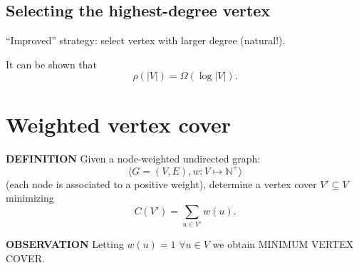 \subsection{Selecting the highest-degree vertex}
``Improved'' strategy: select vertex with larger degree (natural!).

It can be shown that
\[\rho(|V|)=\Omega(\log|V|).\]
\section{Weighted vertex cover}
\begin{notesdefinition}
\textbf{DEFINITION} Given a node-weighted undirected graph:
\[\langle G=(V,E),w:V\mapsto\mathbb N^+\rangle\]
(each node is associated to a positive weight), determine a vertex cover $V'\subseteq V$ minimizing
\[C(V')=\sum_{u\in V'}w(u).\]
\end{notesdefinition}
\textbf{OBSERVATION} Letting $w(u)=1$ $\forall u\in V$ we obtain MINIMUM VERTEX COVER.
